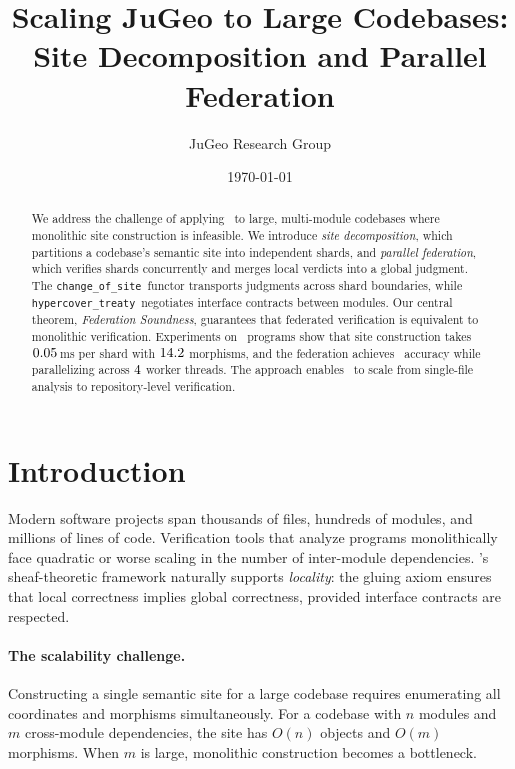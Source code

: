 \documentclass[11pt]{article}
\title{\textbf{Scaling JuGeo to Large Codebases:\\
Site Decomposition and Parallel Federation}}
\author{%
  JuGeo Research Group
}
\date{\today}
\newcommand{\ChangeOfSite}{\texttt{change\_of\_site}}
\newcommand{\HypercoverTreaty}{\texttt{hypercover\_treaty}}
\begin{document}
\maketitle

\begin{abstract}
We address the challenge of applying \JuGeo\ to large, multi-module
codebases where monolithic site construction is infeasible.  We
introduce \emph{site decomposition}, which partitions a codebase's
semantic site into independent shards, and \emph{parallel federation},
which verifies shards concurrently and merges local verdicts into a
global judgment.  The \ChangeOfSite\ functor transports judgments
across shard boundaries, while \HypercoverTreaty\ negotiates interface
contracts between modules.  Our central theorem, \emph{Federation
Soundness}, guarantees that federated verification is equivalent to
monolithic verification.  Experiments on \expTotalPrograms\ programs
show that site construction takes $0.05$\,ms per
shard with $14.2$ morphisms, and the federation
achieves \compOverallAccuracy\ accuracy while parallelizing across
$4$ worker threads.  The approach enables \JuGeo\
to scale from single-file analysis to repository-level verification.
\end{abstract}

\newpage

\section{Introduction}\label{sec:intro}

Modern software projects span thousands of files, hundreds of modules,
and millions of lines of code.  Verification tools that analyze
programs monolithically face quadratic or worse scaling in the number
of inter-module dependencies.  \JuGeo's sheaf-theoretic framework
naturally supports \emph{locality}: the gluing axiom ensures that
local correctness implies global correctness, provided interface
contracts are respected.

\paragraph{The scalability challenge.}
Constructing a single semantic site for a large codebase requires
enumerating all coordinates and morphisms simultaneously.  For a
codebase with $n$ modules and $m$ cross-module dependencies, the
site has $O(n)$ objects and $O(m)$ morphisms.  When $m$ is large,
monolithic construction becomes a bottleneck.
\end{document}
